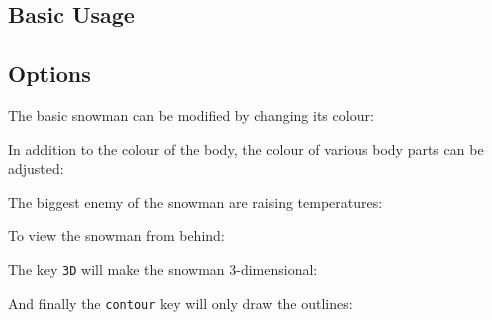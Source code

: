 \documentclass[parskip=half]{scrartcl}
\begin{document}
\subsection{Basic Usage}

\begin{tcblisting}{}
\snowman
\end{tcblisting}

\subsection{Options}

The basic snowman can be modified by changing its colour:
\begin{tcblisting}{}
\snowman[body=blue]
\end{tcblisting}

In addition to the colour of the body, the colour of various body parts can be adjusted:
\begin{tcblisting}{}
\snowman[eye=red]
\end{tcblisting}
\begin{tcblisting}{}
\snowman[nose=red]
\end{tcblisting}
\begin{tcblisting}{}
\snowman[mouth=red]
\end{tcblisting}
\begin{tcblisting}{}
\snowman[buttons=red]
\end{tcblisting}

The biggest enemy of the snowman are raising temperatures:
\begin{tcblisting}{}
\end{tcblisting}

To view the snowman from behind:
\begin{tcblisting}{}
\snowman[back]
\end{tcblisting}

The key \lstinline|3D| will make the snowman 3-dimensional:
\begin{tcblisting}{}
\snowman[3D]
\end{tcblisting}

And finally the \lstinline|contour| key will only draw the outlines:
\begin{tcblisting}{}
\snowman[contour=black]
\end{tcblisting}

%
%
\clearpage
\end{document}

